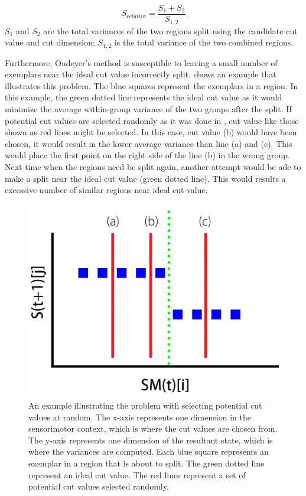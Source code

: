 \begin{equation}
S_{relative} = \frac{S_1+S_2}{S_{1,2}}
\end{equation}
$S_1$ and $S_2$ are the total variances of the two regions split using the candidate cut value and cut dimension; $S_{1,2}$ is the total variance of the two combined regions.

Furthermore, Oudeyer's method is susceptible to leaving a small number of exemplars near the ideal cut value incorrectly split.  shows an example that illustrates this problem. The blue squares represent the exemplars in a region. In this example, the green dotted line represents the ideal cut value as it would minimize the average within-group variance of the two groups after the split. If potential cut values are selected randomly as it was done in \cite{Oudeyer2005}, cut value like those shown as red lines might be selected. In this case, cut value (b) would have been chosen, it would result in the lower average variance than line (a) and (c). This would place the first point on the right side of the line (b) in the wrong group. Next time when the regions need be split again, another attempt would be ade to make a split near the ideal cut value (green dotted line). This would results a excessive number of similar regions near ideal cut value. 

\begin{figure}[htb]
	\centering
	\includegraphics[width=0.7 \textwidth]{"fig/cbla/bad-cut-example"}
	\caption[An example of making undesirable cuts using randomly selection method]{An example illustrating the problem with selecting potential cut values at random. The x-axis represents one dimension in the sensorimotor context, which is where the cut values are chosen from. The y-axis represents one dimension of the resultant state, which is where the variances are computed. Each blue square represents an exemplar in a region that is about to split. The green dotted line represent an ideal cut value. The red lines represent a set of potential cut values selected randomly.}
	\label{fig:bad-cut-example}
\end{figure}

